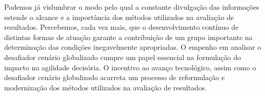 \begin{agradecimentos}
Podemos já vislumbrar o modo pelo qual a constante divulgação das informações estende o alcance e a importância dos métodos utilizados na avaliação de resultados. 
Percebemos, cada vez mais, que o desenvolvimento contínuo de distintas formas de atuação garante a contribuição de um grupo importante na determinação das condições inegavelmente apropriadas.
O empenho em analisar o desafiador cenário globalizado cumpre um papel essencial na formulação do impacto na agilidade decisória.
O incentivo ao avanço tecnológico, assim como o desafiador cenário globalizado acarreta um processo de reformulação e modernização dos métodos utilizados na avaliação de resultados.

\end{agradecimentos}